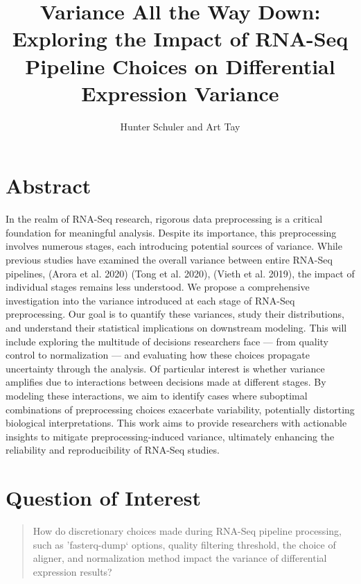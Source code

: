 \documentclass[
  letterpaper,
]{article}
\title{\textbf{Variance All the Way Down:} Exploring the Impact of
RNA-Seq Pipeline Choices on Differential Expression Variance}
\author{Hunter Schuler and Art Tay}
\date{}
\begin{document}
\maketitle
\ifdefined\Shaded\renewenvironment{Shaded}{\begin{tcolorbox}[boxrule=0pt, frame hidden, borderline west={3pt}{0pt}{shadecolor}, interior hidden, enhanced, breakable, sharp corners]}{\end{tcolorbox}}\fi

\hypertarget{abstract}{%
\section{Abstract}\label{abstract}}

In the realm of RNA-Seq research, rigorous data preprocessing is a
critical foundation for meaningful analysis. Despite its importance,
this preprocessing involves numerous stages, each introducing potential
sources of variance. While previous studies have examined the overall
variance between entire RNA-Seq pipelines, (Arora et al. 2020) (Tong et
al. 2020), (Vieth et al. 2019), the impact of individual stages remains
less understood. We propose a comprehensive investigation into the
variance introduced at each stage of RNA-Seq preprocessing. Our goal is
to quantify these variances, study their distributions, and understand
their statistical implications on downstream modeling. This will include
exploring the multitude of decisions researchers face --- from quality
control to normalization --- and evaluating how these choices propagate
uncertainty through the analysis. Of particular interest is whether
variance amplifies due to interactions between decisions made at
different stages. By modeling these interactions, we aim to identify
cases where suboptimal combinations of preprocessing choices exacerbate
variability, potentially distorting biological interpretations. This
work aims to provide researchers with actionable insights to mitigate
preprocessing-induced variance, ultimately enhancing the reliability and
reproducibility of RNA-Seq studies.

\hypertarget{question-of-interest}{%
\section{Question of Interest}\label{question-of-interest}}

\begin{quote}
How do discretionary choices made during RNA-Seq pipeline processing,
such as 'fasterq-dump` options, quality filtering threshold, the choice
of aligner, and normalization method impact the variance of differential
expression results?
\end{quote}
\end{document}

